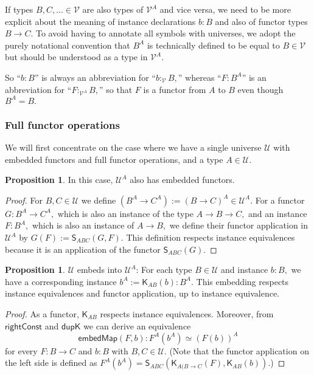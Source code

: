 \documentclass[a4paper]{article}
\theoremstyle{definition}
\newtheorem{proposition}[definition]{Proposition}
\theoremstyle{remark}
\renewcommand{\equiv}{\simeq}
\newcommand{\U}{\mathcal{U}}
\newcommand{\V}{\mathcal{V}}
\newcommand{\nm}{\mathsf}
\newcommand{\combinator}{\nm}
\newcommand{\constFun}{\combinator{K}}
\newcommand{\revSubstFun}{\combinator{S}}
\begin{document}
If types $B,C,\ldots \in \V$ are also types of $\V^A$ and vice versa, we need to be more
explicit about the meaning of instance declarations $b : B$ and also of functor types
$B \to C.$ To avoid having to annotate all symbols with universes, we adopt the purely
notational convention that $B^A$ is technically defined to be equal to $B \in \V$ but
should be understood as a type in $\V^A.$

So ``$b : B$'' is always an abbreviation for ``$b :_\V B,$'' whereas ``$F : B^A$'' is an
abbreviation for ``$F :_{\V^A} B,$'' so that $F$ is a functor from $A$ to $B$ even
though $B^A = B.$

\subsubsection*{Full functor operations}

We will first concentrate on the case where we have a single universe $\U$ with embedded
functors and full functor operations, and a type $A \in \U.$

\begin{proposition}
  In this case, $\U^A$ also has embedded functors.
\end{proposition}
\vspace{-1ex}
\begin{proof}
  For $B,C \in \U$ we define $(B^A \to C^A) := (B \to C)^A \in \U^A.$ For a functor
  $G : B^A \to C^A,$ which is also an instance of the type $A \to B \to C,$ and an
  instance $F : B^A,$ which is also an instance of $A \to B,$ we define their functor
  application in $\U^A$ by $G(F) := \revSubstFun_{ABC}(G,F).$ This definition
  respects instance equivalences because it is an application of the functor
  $\revSubstFun_{ABC}(G).$
\end{proof}

\begin{proposition}
  $\U$ embeds into $\U^A$: For each type $B \in \U$ and instance $b : B,$ we have
  a corresponding instance $b^A := \constFun_{AB}(b) : B^A.$ This embedding
  respects instance equivalences and functor application, up to instance equivalence.
\end{proposition}
\vspace{-1ex}
\begin{proof}
  As a functor, $\constFun_{AB}$ respects instance equivalences.
  Moreover, from $\nm{rightConst}$ and $\nm{dupK}$ we can derive an equivalence
  \[\nm{embedMap}(F,b) : F^A(b^A) \equiv (F(b))^A\]
  for every $F : B \to C$ and $b : B$ with $B,C \in \U.$
  (Note that the functor application on the left side is defined as
  $F^A(b^A) = \revSubstFun_{ABC}(\constFun_{A(B{\to}C}(F),\constFun_{AB}(b)).$)
\end{proof}
\end{document}
